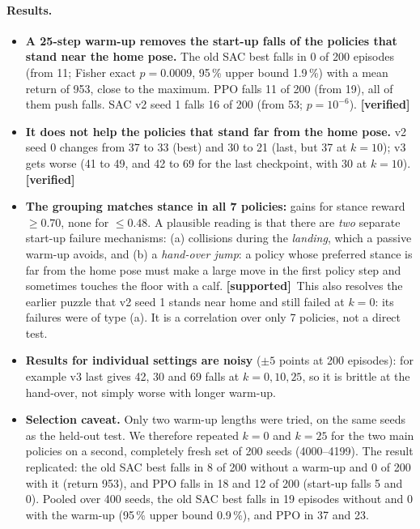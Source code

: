 \documentclass[11pt,a4paper]{article}
\newcommand{\tagv}{\textbf{[verified]}}
\newcommand{\tags}{\textbf{[supported]}}
\begin{document}
\paragraph{Results.}
\begin{itemize}
\item \textbf{A 25-step warm-up removes the start-up falls of the policies that stand near the home pose.} The old SAC best falls in 0 of 200 episodes (from 11; Fisher exact $p=0.0009$, 95\,\% upper bound 1.9\,\%) with a mean return of 953, close to the maximum. PPO falls 11 of 200 (from 19), all of them push falls. SAC v2 seed 1 falls 16 of 200 (from 53; $p=10^{-6}$). \tagv
\item \textbf{It does not help the policies that stand far from the home pose.} v2 seed 0 changes from 37 to 33 (best) and 30 to 21 (last, but 37 at $k=10$); v3 gets worse (41 to 49, and 42 to 69 for the last checkpoint, with 30 at $k=10$). \tagv
\item \textbf{The grouping matches stance in all 7 policies:} gains for stance reward $\ge0.70$, none for $\le0.48$. A plausible reading is that there are \emph{two} separate start-up failure mechanisms: (a) collisions during the \emph{landing}, which a passive warm-up avoids, and (b) a \emph{hand-over jump}: a policy whose preferred stance is far from the home pose must make a large move in the first policy step and sometimes touches the floor with a calf. \tags\ This also resolves the earlier puzzle that v2 seed 1 stands near home and still failed at $k=0$: its failures were of type (a). It is a correlation over only 7 policies, not a direct test.
\item \textbf{Results for individual settings are noisy} ($\pm5$ points at 200 episodes): for example v3 last gives 42, 30 and 69 falls at $k=0,10,25$, so it is brittle at the hand-over, not simply worse with longer warm-up.
\item \textbf{Selection caveat.} Only two warm-up lengths were tried, on the same seeds as the held-out test. We therefore repeated $k=0$ and $k=25$ for the two main policies on a second, completely fresh set of 200 seeds (4000--4199). The result replicated: the old SAC best falls in 8 of 200 without a warm-up and 0 of 200 with it (return 953), and PPO falls in 18 and 12 of 200 (start-up falls 5 and 0). Pooled over 400 seeds, the old SAC best falls in 19 episodes without and 0 with the warm-up (95\,\% upper bound 0.9\,\%), and PPO in 37 and 23.
\end{itemize}

\end{document}

